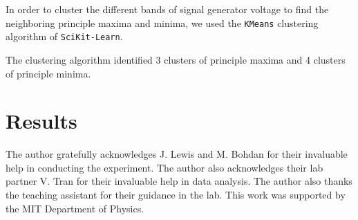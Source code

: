 In order to cluster the different bands of signal generator voltage to find the neighboring principle maxima and minima, we used the \texttt{KMeans} clustering algorithm of \texttt{SciKit-Learn}. 

The clustering algorithm identified 3 clusters of principle maxima and 4 clusters of principle minima. 

\section{Results}


\begin{acknowledgments} The author gratefully acknowledges J. Lewis and M. Bohdan for their invaluable help in conducting the experiment. The author also acknowledges their lab partner V. Tran for their invaluable help in data analysis. The author also thanks the teaching assistant for their guidance in the lab. This work was supported by the MIT Department of Physics. 
\end{acknowledgments}






